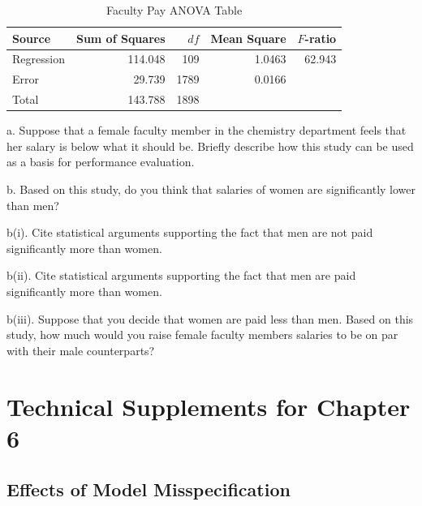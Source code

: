 \begin{exercises}
\begin{table}[h]
\caption{\label{Ex:FacultyPayANOVA} \small Faculty Pay ANOVA Table}
\begin{center}
\begin{tabular}{l|rrrr}
\hline Source & Sum of Squares & $df$ & Mean Square & $F$-ratio\\
\hline
Regression & 114.048 & 109 & 1.0463 & 62.943\\
Error & 29.739 & 1789 & 0.0166 &\\
Total & 143.788 & 1898 &  &\\ \hline
\end{tabular}
\end{center}
\end{table}

a. Suppose that a female faculty member in the chemistry department
feels that her salary is below what it should be. Briefly describe
how this study can be used as a basis for performance evaluation.

b. Based on this study, do you think that salaries of women are
significantly lower than men?

b(i). Cite statistical arguments supporting the fact that men are
not paid significantly more than women.

b(ii). Cite statistical arguments supporting the fact that men are
paid significantly more than women.

b(iii). Suppose that you decide that women are paid less than men.
Based on this study, how much would you raise female faculty members
salaries to be on par with their male counterparts?


\end{exercises}

\section{Technical Supplements for Chapter 6}


\subsection{Effects of Model Misspecification}

